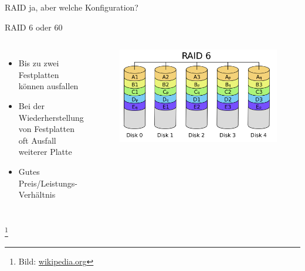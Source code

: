 \documentclass[10pt]{beamer}
\newcommand\blfootnote[1]{%
	\begingroup
	\renewcommand\thefootnote{}\footnote{#1}%
	\addtocounter{footnote}{-1}%
	\endgroup
}
\begin{document}
%
%
\begin{frame}[fragile]{RAID ja, aber welche Konfiguration?}
\begin{alertblock}{RAID 6 oder 60}
\end{alertblock}
\begin{columns}[T,c,onlytextwidth]
	\begin{itemize}
		\item Bis zu zwei Festplatten können ausfallen
		\item Bei der Wiederherstellung von Festplatten oft Ausfall weiterer Platte
		\item Gutes Preis/Leistungs-Verhältnis
	\end{itemize}
	\begin{figure}
		\includegraphics[width=1\textwidth]{images/RAID_6}
	\end{figure}
\end{columns}
\blfootnote{Bild: \href{https://de.wikipedia.org}{wikipedia.org}}
\end{frame}
\end{document}
